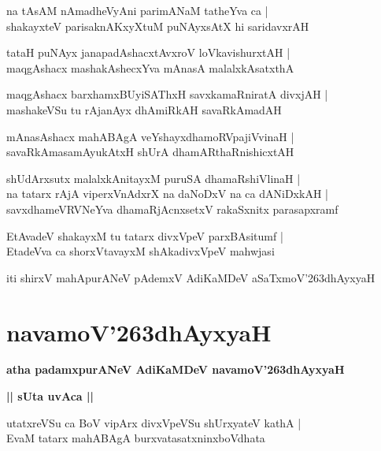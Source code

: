 \documentclass[twoside,12pt,openright]{book}
\def\S{\char'263}
\newcounter{shloka}[chapter]
\def\uvaca#1{\centerline{{\large\textbf{#1}}}}
\begin{document}
\begin{shloka}
na tAsAM nAmadheVyAni parimANaM tatheYva ca |\\
shakayxteV parisaknAKxyXtuM puNAyxsAtX hi saridavxrAH 
\end{shloka}

\begin{shloka}
tataH puNAyx janapadAshacxtAvxroV loVkavishurxtAH |\\
maqgAshacx mashakAshecxYva mAnasA malalxkAsatxthA
\end{shloka}

\begin{shloka}
maqgAshacx barxhamxBUyiSAThxH savxkamaRniratA divxjAH |\\
mashakeVSu tu rAjanAyx dhAmiRkAH savaRkAmadAH
\end{shloka}

\begin{shloka}
mAnasAshacx mahABAgA veYshayxdhamoRVpajiVvinaH |\\
savaRkAmasamAyukAtxH shUrA dhamARthaRnishicxtAH
\end{shloka}

\begin{shloka}
shUdArxsutx malalxkAnitayxM puruSA dhamaRshiVlinaH |\\
na tatarx rAjA viperxVnAdxrX na daNoDxV na ca dANiDxkAH |\\
savxdhameVRVNeYva dhamaRjAcnxsetxV rakaSxnitx parasapxramf
\end{shloka}

\begin{shloka}
EtAvadeV shakayxM tu tatarx divxVpeV parxBAsitumf |\\
EtadeVva ca shorxVtavayxM shAkadivxVpeV mahwjasi
\end{shloka}

\begin{center}
iti shirxV mahApurANeV pAdemxV AdiKaMDeV aSaTxmoV\S dhAyxyaH
\end{center}

\chapter{navamoV\S dhAyxyaH}

\begin{center}
{\LARGE\bfseries atha padamxpurANeV AdiKaMDeV navamoV\S dhAyxyaH}
\end{center}

\uvaca{|| sUta uvAca ||}

\begin{shloka}
utatxreVSu ca BoV vipArx divxVpeVSu shUrxyateV kathA |\\
EvaM tatarx mahABAgA burxvatasatxninxboVdhata
\end{shloka}
\end{document}
